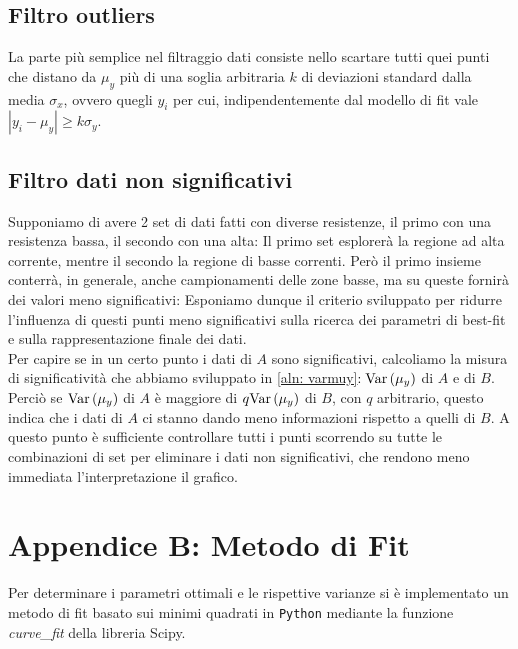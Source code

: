 \documentclass{article}[a4paper, oneside, 11pt]
\begin{document}
\subsection{Filtro outliers}
La parte più semplice nel filtraggio dati consiste nello scartare tutti quei
punti che distano da $\mu_y$ più di una soglia arbitraria $k$ di deviazioni
standard dalla media $\sigma_x$, ovvero quegli $y_i$ per cui,
indipendentemente dal modello di fit vale $|y_i - \mu_y| \geq k\sigma_y$.
\subsection{Filtro dati non significativi}
Supponiamo di avere 2 set di dati fatti con diverse resistenze, il primo con
una resistenza bassa, il secondo con una alta: Il primo set esplorerà
la regione ad alta corrente, mentre il secondo la regione di basse correnti.
Però il primo insieme conterrà, in generale, anche campionamenti delle zone
basse, ma su queste fornirà dei valori meno significativi: Esponiamo dunque
il criterio sviluppato per ridurre l'influenza di questi punti meno
significativi sulla ricerca dei parametri di best-fit e sulla rappresentazione 
finale dei dati.\\
Per capire se in un certo punto i dati di $A$ sono significativi, calcoliamo
la misura di significatività che abbiamo sviluppato in \eqref{aln: varmuy}$:
\text{Var}\left(\mu_y\right)$ di $A$ e di $B$. Perciò se $\text{Var}\left(\mu_y\right)$ di $A$ è maggiore di 
$q\text{Var}\left(\mu_y\right)$ di $B$, con $q$ arbitrario, questo indica che i dati di $A$
ci stanno dando meno informazioni rispetto a quelli di $B$. A questo punto
è sufficiente controllare tutti i punti scorrendo su tutte le combinazioni
di set per eliminare i dati non significativi, che rendono meno
immediata l'interpretazione il grafico.

\section{Appendice B: Metodo di Fit}
Per determinare i parametri ottimali e le rispettive varianze si \`e
implementato un metodo di fit basato sui minimi quadrati in \verb+Python+
mediante la funzione \emph{curve\_fit} della libreria Scipy\cite{scipy}.
\medskip


\end{document}
